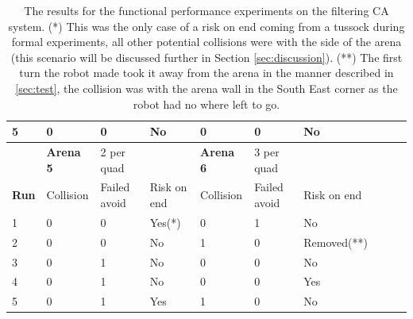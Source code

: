 \documentclass[a4paper,12pt]{article}
\begin{document}
\begin{center}
\begin{table}
\begin{tabular}{|l|l|l|l|l|l|l|l|l|l|}
      5            & 0                & 0                  & No          & 0                & 0            & No            \\ \hline
                   & \textbf{Arena 5} & 2 per quad         &             & \textbf{Arena 6} & 3 per quad   &               \\ \hline
      \textbf{Run} & Collision        & Failed avoid       & Risk on end & Collision        & Failed avoid & Risk on end   \\ \hline
      1            & 0                &  0                 & Yes(*)      & 0                & 1            & No            \\ \hline
      2            & 0                &  0                 & No          & 1                & 0            & Removed(**)   \\ \hline
      3            & 0                &  1                 & No          & 0                & 0            & No            \\ \hline
      4            & 0                &  1                 & No          & 0                & 0            & Yes           \\ \hline 
      5            & 0                &  1                 & Yes         & 1                & 0            & No            \\ \hline
   \end{tabular}
   \caption{The results for the functional performance experiments on the filtering CA system. (*) This was the only case of
     a risk on end coming from a tussock during formal experiments, all other potential collisions were with the side of the arena (this scenario will be discussed further
     in Section \ref{sec:discussion}). (**) The first turn the robot made took it away from the arena in the manner described in \ref{sec:test}, the
     collision was with the arena wall in the South East corner as the robot had no where left to go.
    }
    \label{tab:ofres}
  \end{table}
\end{center}
\end{document}
